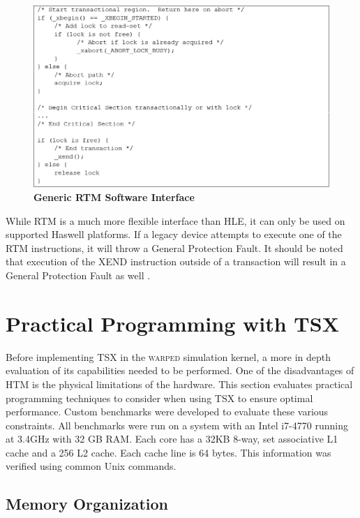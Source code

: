 \documentclass[11pt]{book}
\begin{document}
\begin{figure}[H]
    \centering
    \graphicspath{ {./figures/} }
    \includegraphics[width=\textwidth,height=\textheight,keepaspectratio]{fig_rtmInterface}
    \caption{\textbf{Generic RTM Software Interface}}
    \label{fig:rtm_interface}
\end{figure}

While RTM is a much more flexible interface than HLE, it can only be used on supported
Haswell platforms.  If a legacy device attempts to execute one of the RTM instructions, it
will throw a General Protection Fault.  It should be noted that execution of the XEND
instruction outside of a transaction will result in a General Protection Fault as well
\cite{intel_opt_man}.

\chapter{Practical Programming with TSX}

Before implementing TSX in the \textsc{warped} simulation kernel, a more in depth
evaluation of its capabilities needed to be performed.  One of the disadvantages
of HTM is the physical limitations of the hardware.  This section evaluates
practical programming techniques to consider when using TSX to ensure optimal
performance.  Custom benchmarks were developed to evaluate these various
constraints.  All benchmarks were run on a system with an Intel i7-4770 running
at 3.4GHz with 32 GB RAM.  Each core has a 32KB 8-way, set associative L1 cache
and a 256 L2 cache.  Each cache line is 64 bytes.  This information was verified
using common Unix commands.

\section{Memory Organization}
\end{document}
